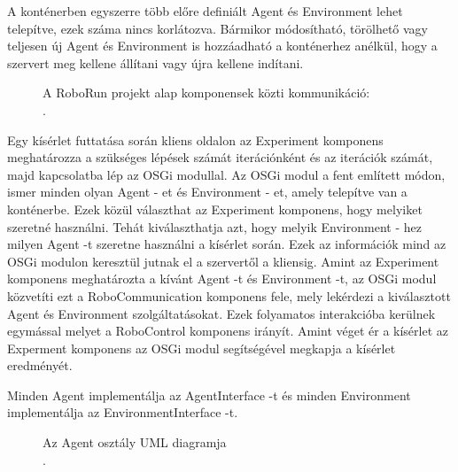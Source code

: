 	 A konténerben egyszerre több előre definiált Agent és Environment lehet telepítve, ezek száma nincs korlátozva. Bármikor módosítható, törölhető vagy teljesen új Agent és Environment is hozzáadható a konténerhez anélkül, hogy a szervert meg kellene állítani vagy újra kellene indítani.

\begin{figure}[t]
  \centering
  \caption[RoboRun alap komponensek]%
  {A RoboRun projekt alap komponensek közti kommunikáció:\\
  {\white .}\hfill\url{}}
  \label{fig:ALAP:sm1}
\end{figure}

Egy kísérlet futtatása során kliens oldalon az Experiment komponens meghatározza a szükséges lépések számát iterációnként és az iterációk számát, majd kapcsolatba lép az OSGi modullal. Az OSGi modul a fent említett módon, ismer minden olyan Agent - et és Environment - et, amely telepítve van a konténerbe. Ezek közül választhat az Experiment komponens, hogy melyiket szeretné használni. Tehát kiválaszthatja azt, hogy melyik Environment - hez milyen Agent -t szeretne használni a kísérlet során. Ezek az információk mind az OSGi modulon keresztül jutnak el a szervertől a kliensig. Amint az Experiment komponens meghatározta a kívánt Agent -t és Environment -t, az OSGi modul közvetíti ezt a RoboCommunication komponens fele, mely lekérdezi a kiválasztott Agent és Environment szolgáltatásokat. Ezek folyamatos interakcióba kerülnek egymással melyet a RoboControl komponens irányít. Amint véget ér a kísérlet az Experment komponens az OSGi modul segítségével megkapja a kísérlet eredményét.

	Minden Agent implementálja az AgentInterface -t és minden Environment implementálja az EnvironmentInterface -t. 

\begin{figure}[t]
  \centering
  \caption[Példa képek beszúrására]%
  {Az Agent osztály UML diagramja\\
  {\white .}\hfill\url{}}
  \label{fig:ALAP:sm1}
\end{figure}


